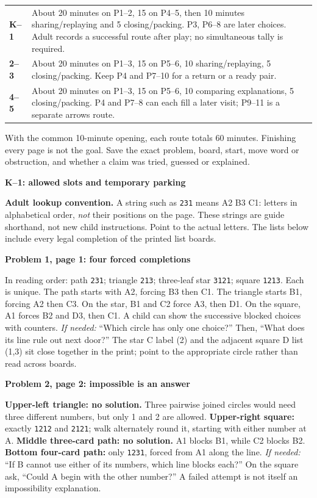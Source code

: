 \documentclass[10pt]{article}
\newcommand{\head}[1]{\par{\large\bfseries #1}\par}
\newcommand{\sub}[1]{\par\textbf{#1}\par}
\newcommand{\hint}[1]{\textit{If needed:} #1}
\newcommand{\word}[1]{\texttt{#1}}
\begin{document}
\begin{tabular}{p{.11\linewidth}p{.82\linewidth}}
\textbf{K--1} & About 20 minutes on P1--2, 15 on P4--5, then 10 minutes sharing/replaying and 5 closing/packing. P3, P6--8 are later choices. Adult records a successful route after play; no simultaneous tally is required.\\[4pt]
\textbf{2--3} & About 20 minutes on P1--3, 15 on P5--6, 10 sharing/replaying, 5 closing/packing. Keep P4 and P7--10 for a return or a ready pair.\\[4pt]
\textbf{4--5} & About 20 minutes on P1--3, 15 on P5--6, 10 comparing explanations, 5 closing/packing. P4 and P7--8 can each fill a later visit; P9--11 is a separate arrows route.\\
\end{tabular}\par
With the common 10-minute opening, each route totals 60 minutes. Finishing every page is not the goal. Save the exact problem, board, start, move word or obstruction, and whether a claim was tried, guessed or explained.
\newpage
\head{K--1: allowed slots and temporary parking}
\textbf{Adult lookup convention.} A string such as \word{231} means A2 B3 C1: letters in alphabetical order, \emph{not} their positions on the page. These strings are guide shorthand, not new child instructions. Point to the actual letters. The lists below include every legal completion of the printed list boards.

\sub{Problem 1, page 1: four forced completions}
In reading order: path \word{231}; triangle \word{213}; three-leaf star \word{3121}; square \word{1213}. Each is unique. The path starts with A2, forcing B3 then C1. The triangle starts B1, forcing A2 then C3. On the star, B1 and C2 force A3, then D1. On the square, A1 forces B2 and D3, then C1. A child can show the successive blocked choices with counters. \hint{``Which circle has only one choice?'' Then, ``What does its line rule out next door?''} The star C label (2) and the adjacent square D list (1,3) sit close together in the print; point to the appropriate circle rather than read across boards.

\sub{Problem 2, page 2: impossible is an answer}
\textbf{Upper-left triangle: no solution.} Three pairwise joined circles would need three different numbers, but only 1 and 2 are allowed. \textbf{Upper-right square:} exactly \word{1212} and \word{2121}; walk alternately round it, starting with either number at A. \textbf{Middle three-card path: no solution.} A1 blocks B1, while C2 blocks B2. \textbf{Bottom four-card path:} only \word{1231}, forced from A1 along the line. \hint{``If B cannot use either of its numbers, which line blocks each?''} On the square ask, ``Could A begin with the other number?'' A failed attempt is not itself an impossibility explanation.
\end{document}
